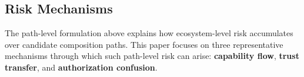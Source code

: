 \documentclass{article}
\begin{document}



\subsection{Risk Mechanisms}


The path-level formulation above explains how ecosystem-level risk accumulates over candidate composition paths. This paper focuses on three representative mechanisms through which such path-level risk can arise: \textbf{capability flow}, \textbf{trust transfer}, and \textbf{authorization confusion}.
\end{document}

